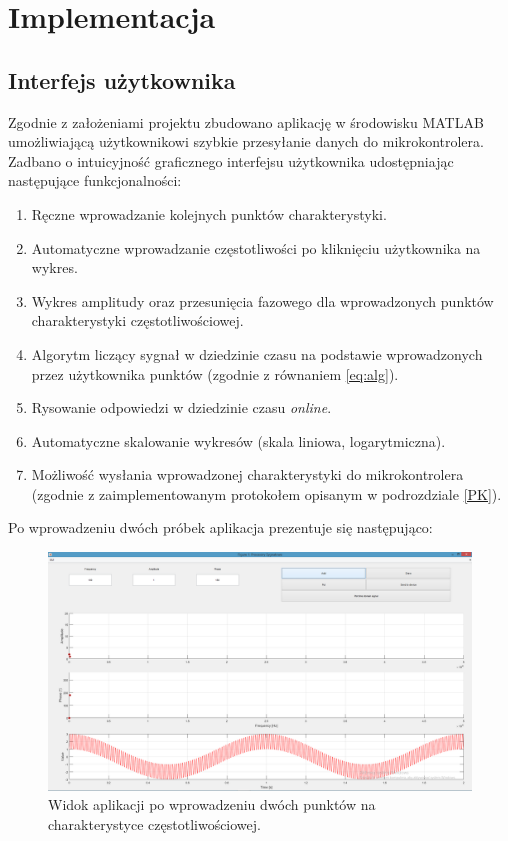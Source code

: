 \section{Implementacja}
\subsection{Interfejs użytkownika}
\label{GUI}
Zgodnie z założeniami projektu zbudowano aplikację w środowisku MATLAB umożliwiającą użytkownikowi szybkie przesyłanie danych do mikrokontrolera. Zadbano o intuicyjność graficznego interfejsu użytkownika udostępniając następujące funkcjonalności:
\begin{enumerate}
	
	\item Ręczne wprowadzanie kolejnych punktów charakterystyki.
	\item Automatyczne wprowadzanie częstotliwości po kliknięciu użytkownika na wykres.
	\item Wykres amplitudy oraz przesunięcia fazowego dla wprowadzonych punktów charakterystyki częstotliwościowej.
	\item Algorytm liczący sygnał w dziedzinie czasu na podstawie wprowadzonych przez użytkownika punktów (zgodnie z równaniem \ref{eq:alg}).
	\item Rysowanie odpowiedzi w dziedzinie czasu \textit{online}.
	\item Automatyczne skalowanie wykresów (skala liniowa, logarytmiczna).
	\item Możliwość wysłania wprowadzonej charakterystyki do mikrokontrolera (zgodnie z zaimplementowanym protokołem opisanym w podrozdziale \ref{PK}).
\end{enumerate} 
Po wprowadzeniu dwóch próbek aplikacja prezentuje się następująco:
\begin{figure}[h!]
	\centering
	\includegraphics[scale = 0.3]{fig/GUI2.png}
	\caption		
	{Widok aplikacji po wprowadzeniu dwóch punktów na charakterystyce częstotliwościowej.}
	\label{gui1}
\end{figure}
